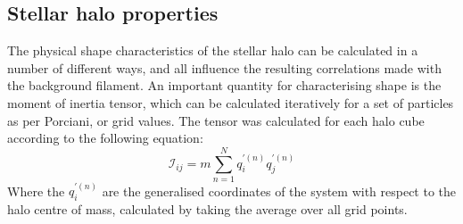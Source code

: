 \subsection{Stellar halo properties}
The physical shape characteristics of the stellar halo can be calculated in a number of different ways, and all influence the resulting correlations made with the background filament. An important quantity for characterising shape is the moment of inertia tensor, which can be calculated iteratively for a set of particles as per Porciani\cite{porciani02a}, or grid values. The tensor was calculated for each halo cube according to the following equation:
\begin{equation}
\mathscr{I}_{ij}=m \sum_{n=1}^{N} q_{i}^{'(n)} q_{j}^{'(n)}
\label{eq:moitensor}
\end{equation}
Where the $q_{i}^{'(n)}$ are the generalised coordinates of the system with respect to the halo centre of mass, calculated by taking the average over all grid points.
